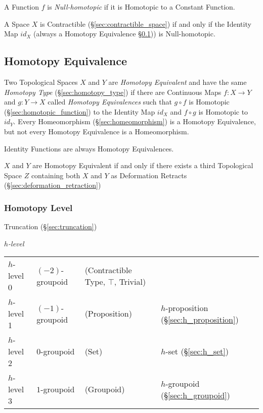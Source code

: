A Function $f$ is \emph{Null-homotopic} if it is Homotopic to a
Constant Function.

A Space $X$ is Contractible (\S\ref{sec:contractible_space}) if and
only if the Identity Map $id_X$ (always a Homotopy Equivalence
\S\ref{sec:homotopy_equivalence})) is Null-homotopic.



\subsection{Homotopy Equivalence}\label{sec:homotopy_equivalence}

Two Topological Spaces $X$ and $Y$ are \emph{Homotopy Equivalent} and
have the same \emph{Homotopy Type} (\S\ref{sec:homotopy_type}) if
there are Continuous Maps $f : X \rightarrow Y$ and $g : Y \rightarrow
X$ called \emph{Homotopy Equivalences} such that $g \circ f$ is
Homotopic (\S\ref{sec:homotopic_function}) to the Identity Map $id_X$
and $f \circ g$ is Homotopic to $id_Y$. Every Homeomorphism
(\S\ref{sec:homeomorphism}) is a Homotopy Equivalence, but not every
Homotopy Equivalence is a Homeomorphism.

Identity Functions are always Homotopy Equivalences. %

$X$ and $Y$ are Homotopy Equivalent if and only if there exists a
third Topological Space $Z$ containing both $X$ and $Y$ as Deformation
Retracts (\S\ref{sec:deformation_retraction})



\subsubsection{Homotopy Level}\label{sec:homotopy_level}

Truncation (\S\ref{sec:truncation})

\emph{$h$-level}

\begin{tabular}{l l l l}
$h$-level 0   & $(-2)$-groupoid & (Contractible Type, $\top$, Trivial)
  & \\
$h$-level 1   & $(-1)$-groupoid & (Proposition)
  & $h$-proposition (\S\ref{sec:h_proposition}) \\
$h$-level 2   & $0$-groupoid    & (Set)
  & $h$-set (\S\ref{sec:h_set}) \\
$h$-level 3   & $1$-groupoid    & (Groupoid)
  & $h$-groupoid (\S\ref{sec:h_groupoid}) \\
\end{tabular}




